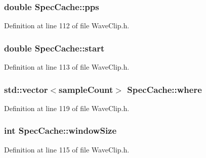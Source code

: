 \subsubsection[{\texorpdfstring{pps}{pps}}]{ double Spec\+Cache\+::pps}\hypertarget{class_spec_cache_a254167324d90b2c532e8bfb5051011fb}{}\label{class_spec_cache_a254167324d90b2c532e8bfb5051011fb}


Definition at line 112 of file Wave\+Clip.\+h.

\subsubsection[{\texorpdfstring{start}{start}}]{ double Spec\+Cache\+::start}\hypertarget{class_spec_cache_a68ceac9d586732bba66ae59a0843ee34}{}\label{class_spec_cache_a68ceac9d586732bba66ae59a0843ee34}


Definition at line 113 of file Wave\+Clip.\+h.

\subsubsection[{\texorpdfstring{where}{where}}]{\setlength{\rightskip}{0pt plus 5cm}std\+::vector$<${\bf sample\+Count}$>$ Spec\+Cache\+::where}\hypertarget{class_spec_cache_ae2c827b1ffd882effd31281fe1d67fc0}{}\label{class_spec_cache_ae2c827b1ffd882effd31281fe1d67fc0}


Definition at line 119 of file Wave\+Clip.\+h.

\subsubsection[{\texorpdfstring{window\+Size}{windowSize}}]{ {\bf int} Spec\+Cache\+::window\+Size}\hypertarget{class_spec_cache_a9c6c2de71ac2d748d7bc69ea95063f5d}{}\label{class_spec_cache_a9c6c2de71ac2d748d7bc69ea95063f5d}


Definition at line 115 of file Wave\+Clip.\+h.

